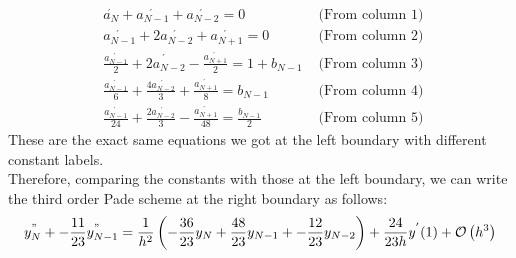 \documentclass[letterpaper]{exam}
\begin{document}
\begin{questions}
\begin{parts}
\begin{solution}
\begin{align*}
    &\acute{a_{N}} + \acute{a_{N-1}} + \acute{a_{N-2}} = 0 &\mbox{ (From column 1) }\\
    &\acute{a_{N-1}} + 2\acute{a_{N-2}} + \acute{a_{N+1}} = 0 &\mbox{ (From column 2)}\\
    &\frac{\acute{a_{N-1}}}{2} + \acute{2a_{N-2}} - \frac{\acute{a_{N+1}}}{2}  = 1 +b_{N-1} &\mbox{ (From column 3)}\\
    &\frac{\acute{a_{N-1}}}{6} + \frac{4\acute{a_{N-2}}}{3} + \frac{\acute{a_{N+1}}}{8} = b_{N-1} &\mbox{ (From column 4)}\\
    &\frac{\acute{a_{N-1}}}{24} + \frac{2\acute{a_{N-2}}}{3} - \frac{\acute{a_{N+1}}}{48}= \frac{b_{N-1}}{2} &\mbox{ (From column 5)}
\end{align*}
These are the exact same equations we got at the left boundary with different constant labels.\\
Therefore, comparing the constants with those at the left boundary, we can write the third order Pade scheme at the right boundary as follows:
\begin{align}\label{5}
   y_{N}^{"}+ -\frac{11}{23}y_{N-1}^{"} = \frac{1}{h^2}\left(-\frac{36}{23}y_{N} + \frac{48}{23}y_{N-1} + -\frac{12}{23}y_{N-2}\right) + \frac{24}{23h}y^{'}(1) + \mathcal{O}\left(h^3\right) 
\end{align}
\end{solution}

\end{parts}
\end{questions}
\end{document}

